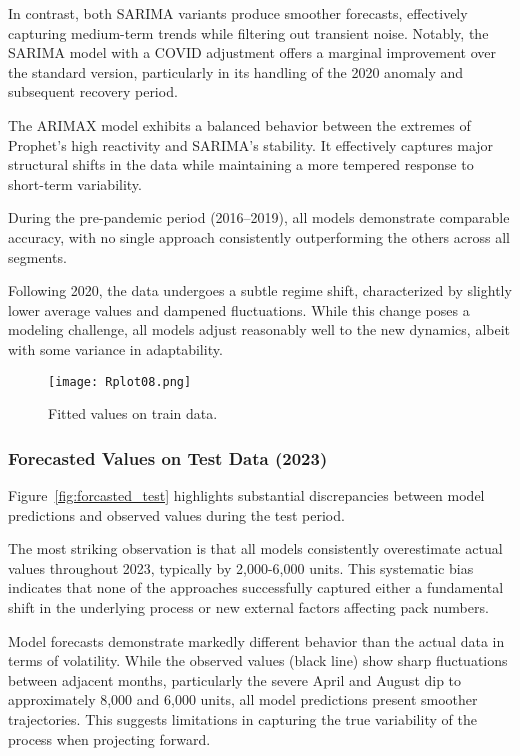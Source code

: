 \documentclass[10pt]{article}
\begin{document}
In contrast, both SARIMA variants produce smoother forecasts, effectively capturing medium-term trends while filtering out transient noise. Notably, the SARIMA model with a COVID adjustment offers a marginal improvement over the standard version, particularly in its handling of the 2020 anomaly and subsequent recovery period.

The ARIMAX model exhibits a balanced behavior between the extremes of Prophet’s high reactivity and SARIMA’s stability. It effectively captures major structural shifts in the data while maintaining a more tempered response to short-term variability.

During the pre-pandemic period (2016–2019), all models demonstrate comparable accuracy, with no single approach consistently outperforming the others across all segments.

Following 2020, the data undergoes a subtle regime shift, characterized by slightly lower average values and dampened fluctuations. While this change poses a modeling challenge, all models adjust reasonably well to the new dynamics, albeit with some variance in adaptability.


\begin{figure}[ht]
\centering
\texttt{[image: Rplot08.png]}
\caption{Fitted values on train data.}
\label{fig:fitted_train}
\end{figure}


\subsubsection{Forecasted Values on Test Data (2023)}

Figure~\ref{fig:forcasted_test} highlights substantial discrepancies between model predictions and observed values during the test period.

The most striking observation is that all models consistently overestimate actual values throughout 2023, typically by 2,000-6,000 units. This systematic bias indicates that none of the approaches successfully captured either a fundamental shift in the underlying process or new external factors affecting pack numbers.

Model forecasts demonstrate markedly different behavior than the actual data in terms of volatility. While the observed values (black line) show sharp fluctuations between adjacent months, particularly the severe April and August dip to approximately 8,000 and 6,000 units, all model predictions present smoother trajectories. This suggests limitations in capturing the true variability of the process when projecting forward.
\end{document}
